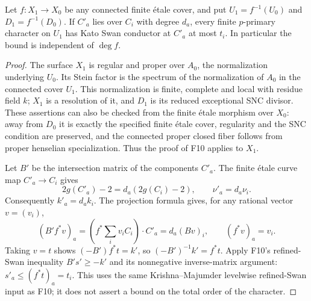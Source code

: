 \begin{lemma}
Let $f:X_1\to X_0$ be any connected finite \'etale cover, and put
$U_1=f^{-1}(U_0)$ and $D_1=f^{-1}(D_0)$. If $C'_a$ lies over
$C_i$ with degree $d_a$, every finite $p$-primary character on
$U_1$ has Kato Swan conductor at $C'_a$ at most $t_i$.
In particular the bound is independent of $\deg f$.
\end{lemma}
\begin{proof}
The surface $X_1$ is regular and proper over $A_0$, the
normalization underlying $U_0$. Its Stein factor is the spectrum
of the normalization of $A_0$ in the connected cover $U_1$.
This normalization is finite, complete and local with residue
field $k$; $X_1$ is a resolution of it, and $D_1$ is its reduced
exceptional SNC divisor. These assertions can also be checked
from the finite \'etale morphism over $X_0$: away from $D_0$
it is exactly the specified finite \'etale cover, regularity
and the SNC condition are preserved, and the connected proper
closed fiber follows from proper henselian specialization.
Thus the proof of F10 applies to $X_1$.

Let $B'$ be the intersection matrix of the components $C'_a$.
The finite \'etale curve map $C'_a\to C_i$ gives
\[
 2g(C'_a)-2=d_a(2g(C_i)-2),\qquad \nu'_a=d_a\nu_i.
 \tag{F13.3}
\]
Consequently $k'_a=d_a k_i$. The projection formula gives, for
any rational vector $v=(v_i)$,
\[
 \left(B'f^*v\right)_a
 =\left(f^*\sum_i v_iC_i\right)\cdot C'_a
 =d_a(Bv)_i,
 \qquad (f^*v)_a=v_i.
 \tag{F13.4}
\]
Taking $v=t$ shows $(-B')f^*t=k'$, so
$(-B')^{-1}k'=f^*t$. Apply F10's refined-Swan inequality
$B's'\geq-k'$ and its nonnegative inverse-matrix argument:
$s'_a\leq(f^*t)_a=t_i$. This uses the same
Krishna--Majumder levelwise refined-Swan input as F10; it does
not assert a bound on the total order of the character.
\end{proof}

